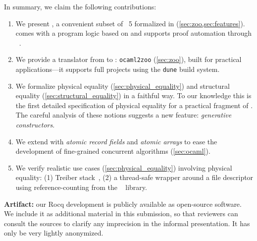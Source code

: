 In summary, we claim the following contributions:
\begin{enumerate}
  \item
    We present \ZooLang, a convenient subset of \OCaml~5 formalized in \Rocq (\cref{sec:zoo,sec:features}).
    \ZooLang comes with a program logic based on \Iris and supports proof automation through \Diaframe~\cite{DBLP:conf/pldi/MulderKG22,DBLP:journals/pacmpl/MulderK23}.
  \item
    We provide a translator from \OCaml to \ZooLang: \texttt{ocaml2zoo} (\cref{sec:zoo}), built for practical
    applications---it supports full projects using the \texttt{dune} build system.
  \item
    We formalize physical equality (\cref{sec:physical_equality}) and structural equality (\cref{sec:structural_equality}) in a faithful way.
    To our knowledge this is the first detailed specification of physical equality for a practical fragment of \OCaml.
    The careful analysis of these notions suggests a new \OCaml feature: \emph{generative constructors}.
  \item
    We extend \OCaml with \emph{atomic record fields} and \emph{atomic arrays} to ease the development of fine-grained concurrent algorithms (\cref{sec:ocaml}).
  \item
    We verify realistic use cases (\cref{sec:physical_equality}) involving physical equality: (1) Treiber stack~\cite{thomas1986systems}, (2) a thread-safe wrapper around a file descriptor using reference-counting from the \Eio~\cite{eio} library.
\end{enumerate}

\textbf{Artifact:} our Rocq development is publicly available as open-source software. We include it as additional material in this submission, so that reviewers can consult the sources to clarify any imprecision in the informal presentation. It has only be very lightly anonymized.
